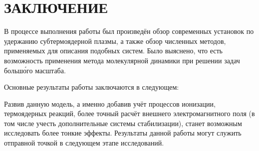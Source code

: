 \chapter*{ЗАКЛЮЧЕНИЕ}						%


В процессе выполнения работы был произведён обзор современных установок по удержанию субтермоядерной плазмы, а также обзор численных методов, применяемых для описания подобных систем. Было выяснено, что есть возможность применения метода молекулярной динамики при решении задач больш\'{о}го масштаба.

Основные результаты работы заключаются в следующем:


Развив данную модель, а именно добавив учёт процессов ионизации, термоядерных реакций, более точный расчёт внешнего электромагнитного поля (в том числе учесть дополнительные системы стабилизации), станет возможным исследовать более тонкие эффекты. Результаты данной работы могут служить отправной точкой в следующем этапе исследований.
